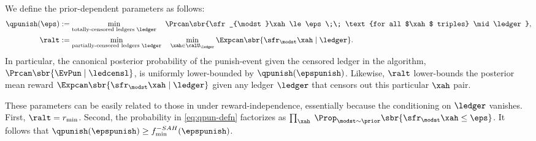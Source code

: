 
We define the prior-dependent parameters as follows:
\begin{align}
\qpunish(\eps) &:=
    \min_{\text{totally-censored ledgers $\ledger$}}\quad
        \Prcan\sbr{\sfr_{\modst}\xah \le \eps \;\;
            \text{for all $\xah$ triples} \mid \ledger},
            \label{eq:qpun-defn}\\
\ralt &:=
    \min_{\text{partially-censored ledgers $\ledger$}}\quad
    \min_{\xah \in \calU_{\ledger}}
    \Expcan\sbr{ \sfr_{\modst}\xah \mid \ledger }.
        \label{eq:ralt-defn}
\end{align}
In particular, the canonical posterior probability of the punish-event given the censored ledger in the algorithm,
    $\Prcan\sbr{ \EvPun\mid \ledcensl}$,
is uniformly lower-bounded by $\qpunish(\epspunish)$.
Likewise, $\ralt$ lower-bounds the posterior mean reward
    $\Expcan\sbr{ \sfr_{\modst}\xah \mid \ledger }$
given any ledger $\ledger$ that censors out this particular $\xah$ pair.

\begin{remark}\label{rem:reduction-to-independence}
These parameters can be easily related to those in  under reward-independence, essentially because the conditioning on $\ledger$ vanishes. First, $\ralt=r_{\min}$. Second, the probability in \eqref{eq:qpun-defn} factorizes as
    $\prod_{\xah}\; \Prop_{\modst \sim \prior} \sbr{\sfr_{\modst}\xah \le \eps}$.
It follows that
$\qpunish(\epspunish) \geq f_{\min}^{-SAH}(\epspunish)$.
\end{remark}

\begin{comment}where (i) the minimum is taken over all censored lends $\ledcens$ for each there exists a triple $\xah \in \reach_{\rho}(\modst)$ which appears strictly less than $\nlearn$ times, (ii) where $\calU(\ledcens)$ is the set of all triples $\xah \in \Utot$ which appear less than $\nlearn$ times in $\ledcens$, (iii) $\modpunish(\ledcens)$ is the set of models $\mu$ for which $r_{\model}\xah \le \epspunish$ for all $\xah \in\Utot \setminus \calU(\ledcens)$, and where $\Dhalnol$ is the hallucination distribution induced by drawing $\model_{\mathrm{hal}} \sim \Prcan[\cdot \mid \ledcens, \modclass(\ledcens)]$, and then imputing the rewards in $\ledcens$ as draws from its reward distirbution (as in).
\end{comment}

